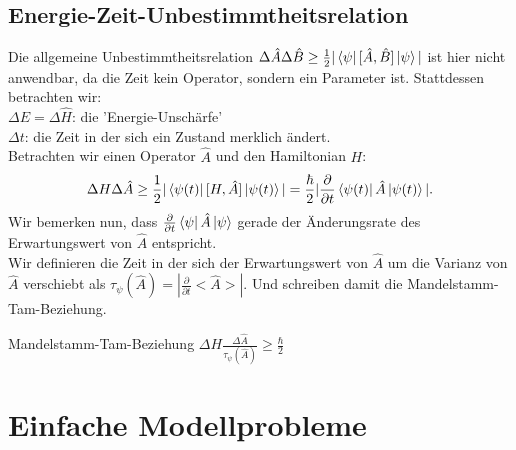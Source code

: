 \documentclass{report}
\begin{document}
\section{Energie-Zeit-Unbestimmtheitsrelation}
Die allgemeine Unbestimmtheitsrelation $\Delta \hat{A} \Delta \hat{B} \ge \frac{1}{2} | \bra{\psi } [\hat{A}, \hat{B}] \ket{\psi }| $ ist hier nicht anwendbar, da die Zeit kein Operator, sondern ein Parameter ist. Stattdessen betrachten wir: \\
$\Delta E = \Delta \hat{H}$: die 'Energie-Unschärfe' \\
$\Delta t$: die Zeit in der sich ein Zustand merklich ändert.\\
Betrachten wir einen Operator $\hat{A}$ und den Hamiltonian $H$: \[
	\Delta H \Delta \hat{A} \ge \frac{1}{2} |\bra{\psi(t)} [H, \hat{A}] \ket{\psi(t)} | = \frac{\hbar }{2} |\frac{\partial}{\partial t} \bra{\psi(t)} \hat{A} \ket{\psi(t)} |
.\] Wir bemerken nun, dass $\frac{\partial}{\partial t} \bra{\psi } \hat{A} \ket{\psi }$ gerade der Änderungsrate des Erwartungswert von $\hat{A}$ entspricht. \\
Wir definieren die Zeit in der sich der Erwartungswert von $\hat{A}$ um die Varianz von $\hat{A}$ verschiebt als $\tau_\psi(\hat{A}) = |\frac{\partial}{\partial t} <\hat{A}>|$. Und schreiben damit die Mandelstamm-Tam-Beziehung.
\begin{redbox}{Mandelstamm-Tam-Beziehung}
	$\Delta H \frac{\Delta \hat{A}}{\tau_\psi(\hat{A})} \ge \frac{\hbar}{2}$
\end{redbox}
\chapter{Einfache Modellprobleme}
\end{document}
